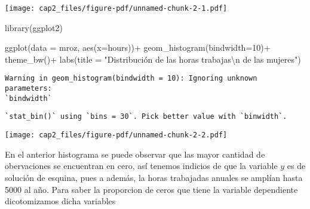 \documentclass[
  letterpaper,
  DIV=11,
  numbers=noendperiod]{scrreprt}
\newenvironment{Shaded}{\begin{snugshade}}{\end{snugshade}}
\newcommand{\AttributeTok}[1]{\textcolor[rgb]{0.40,0.45,0.13}{#1}}
\newcommand{\CommentTok}[1]{\textcolor[rgb]{0.37,0.37,0.37}{#1}}
\newcommand{\DecValTok}[1]{\textcolor[rgb]{0.68,0.00,0.00}{#1}}
\newcommand{\FunctionTok}[1]{\textcolor[rgb]{0.28,0.35,0.67}{#1}}
\newcommand{\NormalTok}[1]{\textcolor[rgb]{0.00,0.23,0.31}{#1}}
\newcommand{\OtherTok}[1]{\textcolor[rgb]{0.00,0.23,0.31}{#1}}
\newcommand{\SpecialCharTok}[1]{\textcolor[rgb]{0.37,0.37,0.37}{#1}}
\newcommand{\StringTok}[1]{\textcolor[rgb]{0.13,0.47,0.30}{#1}}
\begin{document}
\texttt{[image: cap2\_files/figure-pdf/unnamed-chunk-2-1.pdf]}

\begin{Shaded}
\begin{Highlighting}[]
\FunctionTok{library}\NormalTok{(ggplot2)}

\FunctionTok{ggplot}\NormalTok{(}\AttributeTok{data =}\NormalTok{ mroz, }\FunctionTok{aes}\NormalTok{(}\AttributeTok{x=}\NormalTok{hours))}\SpecialCharTok{+}
  \FunctionTok{geom\_histogram}\NormalTok{(}\AttributeTok{bindwidth=}\DecValTok{10}\NormalTok{)}\SpecialCharTok{+}
  \FunctionTok{theme\_bw}\NormalTok{()}\SpecialCharTok{+}
  \FunctionTok{labs}\NormalTok{(}\AttributeTok{title =} \StringTok{"Distribución de las horas trabajas}\SpecialCharTok{\textbackslash{}n}\StringTok{ de las mujeres"}\NormalTok{)}
\end{Highlighting}
\end{Shaded}

\begin{verbatim}
Warning in geom_histogram(bindwidth = 10): Ignoring unknown parameters:
`bindwidth`
\end{verbatim}

\begin{verbatim}
`stat_bin()` using `bins = 30`. Pick better value with `binwidth`.
\end{verbatim}

\texttt{[image: cap2\_files/figure-pdf/unnamed-chunk-2-2.pdf]}

En el anterior histograma se puede observar que las mayor cantidad de
obervaciones se encuentran en cero, así tenemos indicios de que la
variable \(y\) es de solución de esquina, pues a además, la horas
trabajadas anuales se amplían hasta 5000 al año. Para saber la
proporcion de ceros que tiene la variable dependiente dicotomizamos
dicha variables

\begin{Shaded}
\end{Shaded}
\end{document}
